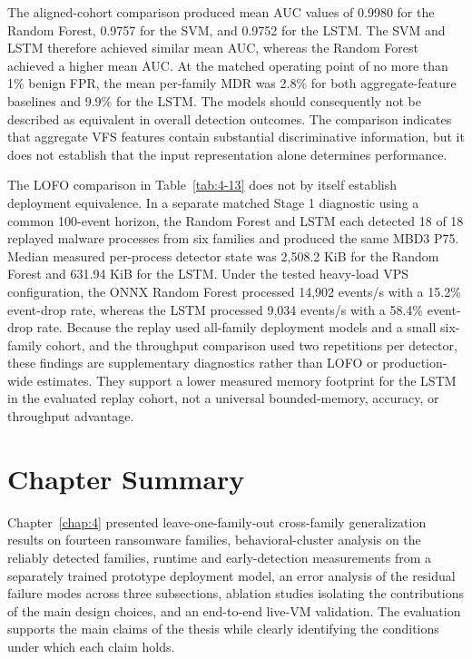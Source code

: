 The aligned-cohort comparison produced mean AUC values of 0.9980 for the Random Forest, 0.9757 for the SVM, and 0.9752 for the \textmu{}LSTM. The SVM and \textmu{}LSTM therefore achieved similar mean AUC, whereas the Random Forest achieved a higher mean AUC. At the matched operating point of no more than 1\% benign FPR, the mean per-family MDR was 2.8\% for both aggregate-feature baselines and 9.9\% for the \textmu{}LSTM. The models should consequently not be described as equivalent in overall detection outcomes. The comparison indicates that aggregate VFS features contain substantial discriminative information, but it does not establish that the input representation alone determines performance.

The LOFO comparison in Table~\ref{tab:4-13} does not by itself establish deployment equivalence. In a separate matched Stage 1 diagnostic using a common 100-event horizon, the Random Forest and \textmu{}LSTM each detected 18 of 18 replayed malware processes from six families and produced the same MBD3 P75. Median measured per-process detector state was 2,508.2 KiB for the Random Forest and 631.94 KiB for the \textmu{}LSTM. Under the tested heavy-load VPS configuration, the ONNX Random Forest processed 14,902 events/\allowbreak{}s with a 15.2\% event-drop rate, whereas the \textmu{}LSTM processed 9,034 events/\allowbreak{}s with a 58.4\% event-drop rate. Because the replay used all-family deployment models and a small six-family cohort, and the throughput comparison used two repetitions per detector, these findings are supplementary diagnostics rather than LOFO or production-wide estimates. They support a lower measured memory footprint for the \textmu{}LSTM in the evaluated replay cohort, not a universal bounded-memory, accuracy, or throughput advantage.

\section{Chapter Summary}\label{sec:4.10}

Chapter~\ref{chap:4} presented leave-one-family-out cross-family generalization results on fourteen ransomware families, behavioral-cluster analysis on the reliably detected families, runtime and early-detection measurements from a separately trained prototype deployment model, an error analysis of the residual failure modes across three subsections, ablation studies isolating the contributions of the main design choices, and an end-to-end live-VM validation. The evaluation supports the main claims of the thesis while clearly identifying the conditions under which each claim holds.

